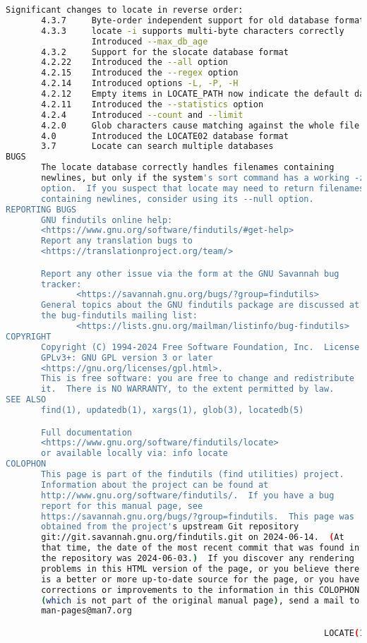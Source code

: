{{\begin{lstlisting}[language=bash]
       Significant changes to locate in reverse order:
       4.3.7     Byte-order independent support for old database format
       4.3.3     locate -i supports multi-byte characters correctly
                 Introduced --max_db_age
       4.3.2     Support for the slocate database format
       4.2.22    Introduced the --all option
       4.2.15    Introduced the --regex option
       4.2.14    Introduced options -L, -P, -H
       4.2.12    Empty items in LOCATE_PATH now indicate the default database
       4.2.11    Introduced the --statistics option
       4.2.4     Introduced --count and --limit
       4.2.0     Glob characters cause matching against the whole file name
       4.0       Introduced the LOCATE02 database format
       3.7       Locate can search multiple databases
BUGS
       The locate database correctly handles filenames containing
       newlines, but only if the system's sort command has a working -z
       option.  If you suspect that locate may need to return filenames
       containing newlines, consider using its --null option.
REPORTING BUGS
       GNU findutils online help:
       <https://www.gnu.org/software/findutils/#get-help>
       Report any translation bugs to
       <https://translationproject.org/team/>

       Report any other issue via the form at the GNU Savannah bug
       tracker:
              <https://savannah.gnu.org/bugs/?group=findutils>
       General topics about the GNU findutils package are discussed at
       the bug-findutils mailing list:
              <https://lists.gnu.org/mailman/listinfo/bug-findutils>
COPYRIGHT
       Copyright (C) 1994-2024 Free Software Foundation, Inc.  License
       GPLv3+: GNU GPL version 3 or later
       <https://gnu.org/licenses/gpl.html>.
       This is free software: you are free to change and redistribute
       it.  There is NO WARRANTY, to the extent permitted by law.
SEE ALSO
       find(1), updatedb(1), xargs(1), glob(3), locatedb(5)

       Full documentation
       <https://www.gnu.org/software/findutils/locate>
       or available locally via: info locate
COLOPHON
       This page is part of the findutils (find utilities) project.
       Information about the project can be found at 
       http://www.gnu.org/software/findutils/.  If you have a bug
       report for this manual page, see
       https://savannah.gnu.org/bugs/?group=findutils.  This page was
       obtained from the project's upstream Git repository
       git://git.savannah.gnu.org/findutils.git on 2024-06-14.  (At
       that time, the date of the most recent commit that was found in
       the repository was 2024-06-03.)  If you discover any rendering
       problems in this HTML version of the page, or you believe there
       is a better or more up-to-date source for the page, or you have
       corrections or improvements to the information in this COLOPHON
       (which is not part of the original manual page), send a mail to
       man-pages@man7.org

                                                               LOCATE(1)
\end{lstlisting}
}}
\endinput  %
